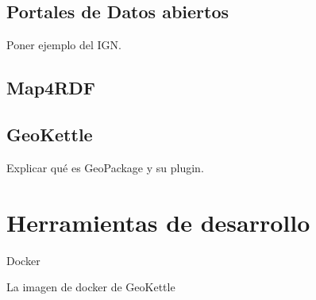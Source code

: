 \subsection{Portales de Datos abiertos} Poner ejemplo del IGN.

\subsection{Map4RDF}


\subsection{GeoKettle} Explicar qué es GeoPackage y su plugin.

\section{Herramientas de desarrollo} Docker

La imagen de docker de GeoKettle


